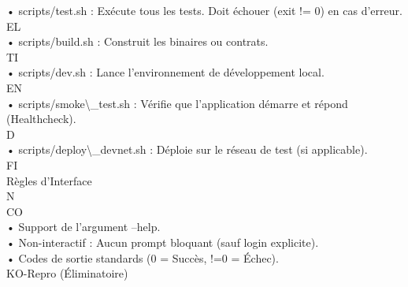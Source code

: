 \vspace{0.5em}
• scripts/test.sh : Exécute tous les tests. Doit échouer (exit != 0) en cas d’erreur.\\
\vspace{0.5em}
\vspace{0.5em}
\vspace{0.5em}
\vspace{0.5em}
EL\\
• scripts/build.sh : Construit les binaires ou contrats.\\
\vspace{0.5em}
\vspace{0.5em}
\vspace{0.5em}
\vspace{0.5em}
TI\\
• scripts/dev.sh : Lance l’environnement de développement local.\\
\vspace{0.5em}
\vspace{0.5em}
\vspace{0.5em}
\vspace{0.5em}
EN\\
• scripts/smoke\textbackslash{}_test.sh : Vérifie que l’application démarre et répond (Healthcheck).\\
\vspace{0.5em}
\vspace{0.5em}
\vspace{0.5em}
\vspace{0.5em}
D\\
• scripts/deploy\textbackslash{}_devnet.sh : Déploie sur le réseau de test (si applicable).\\
\vspace{0.5em}
\vspace{0.5em}
\vspace{0.5em}
\vspace{0.5em}
FI\\
Règles d’Interface\\
N\\
CO\\
• Support de l’argument --help.\\
\vspace{0.5em}
• Non-interactif : Aucun prompt bloquant (sauf login explicite).\\
\vspace{0.5em}
• Codes de sortie standards (0 = Succès, !=0 = Échec).\\
\vspace{0.5em}
KO-Repro (Éliminatoire)\\
